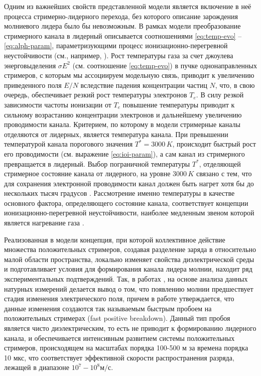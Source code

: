Одним из важнейших свойств представленной модели является включение в неё процесса стримерно-лидерного перехода, без которого описание зарождения молниевого лидера было бы невозможным. В рамках модели преобразование стримерного канала в лидерный описывается соотношениями \eqref{eq:temp-evo} -- \eqref{eq:alph-param}, параметризующими процесс ионизационно-перегревной неустойчивости (см., например, \cite{Raizer2009}). Рост температуры газа за счет джоулева энерговыделения $\sigma E^2$ (см. соотношение \eqref{eq:temp-evo}) в пучке однонаправленных стримеров, с которым мы ассоциируем модельную связь, приводит к увеличению приведенного поля $E / N$ вследствие падения концентрации частиц $N$, что, в свою очередь, обеспечивает резкий рост температуры электронов $T_e$. В силу резкой зависимости частоты ионизации от $T_e$ повышение температуры приводит к сильному возрастанию концентрации электронов и дальнейшему увеличению проводимости канала. Критерием, по которому в модели стримерные каналы отделяются от лидерных, является температура канала. При превышении температурой канала порогового значения $T^* = 3000\,K$, происходит быстрый рост его проводимости (см. выражение \eqref{eq:ioi-param}), а сам канал из стримерного превращается в лидерный. Выбор пограничной температуры $T^*$, отделяющей стримерное состояние канала от лидерного, на уровне $3000\,K$ связано с тем, что для сохранения электронной проводимости канал должен быть нагрет хотя бы до нескольких тысяч градусов \cite{Bazelyan1997}. Рассмотрение именно температуры в качестве основного фактора, определяющего состояние канала, соответствует концепции ионизационно-перегревной неустойчивости, наиболее медленным звеном которой является нагревание газа \cite{Raizer2009}.

Реализованная в модели концепция, при которой коллективное действие множества положительных стримеров, создавая разделение заряда в относительно малой области пространства, локально изменяет свойства диэлектрической среды и подготавливает условия для формирования канала лидера молнии, находит ряд экспериментальных подтверждений. Так, в работах \cite{Rison2016, Chapman2017}, на основе анализа данных натурных измерений делается вывод о том, что появлению молнии предшествует стадия изменения электрического поля, причем в работе \cite{Rison2016} утверждается, что данные изменения создаются так называемым быстрым пробоем на положительных стримерах (fast positive breakdown). Данный тип пробоя является чисто диэлектрическим, то есть не приводит к формированию лидерного канала, и обеспечивается интенсивным развитием системы положительных стримеров, происходящем на масштабах порядка 100-500 м за времена порядка 10 мкс, что соответствует эффективной скорости распространения разряда, лежащей в диапазоне $10^7 - 10^8 \text{м}/\text{с}$.

